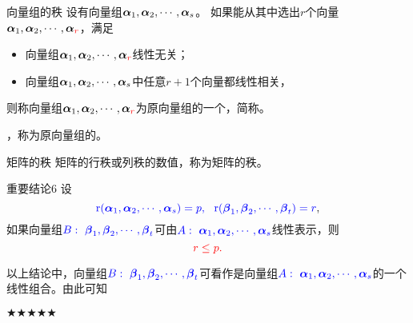 \begin{frame}
  \begin{footnotesize}
    \begin{block}{向量组的秩}
      设有向量组$\boldsymbol{\alpha}_1,\boldsymbol{\alpha}_2,\cdots,\boldsymbol{\alpha}_s$。
      如果能从其中选出$r$个向量$\boldsymbol{\alpha}_1,\boldsymbol{\alpha}_2,\cdots,\boldsymbol{\alpha}_{\textcolor{red}{r}}$，满足
      \begin{itemize}
      \item 向量组$\boldsymbol{\alpha}_1,\boldsymbol{\alpha}_2,\cdots,\boldsymbol{\alpha}_{\textcolor{red}{r}}$线性无关；
      \item 向量组$\boldsymbol{\alpha}_1,\boldsymbol{\alpha}_2,\cdots,\boldsymbol{\alpha}_s$中任意$r+1$个向量都线性相关，
      \end{itemize}
      则称向量组$\boldsymbol{\alpha}_1,\boldsymbol{\alpha}_2,\cdots,\boldsymbol{\alpha}_{\textcolor{red}{r}}$为原向量组的一个，简称。
      \vspace{0.1in}

      ，称为原向量组的。     
    \end{block}

    \begin{block}{矩阵的秩}
      矩阵的行秩或列秩的数值，称为矩阵的秩。
    \end{block}

  \end{footnotesize}
\end{frame}


\begin{frame}
  \begin{footnotesize}
    \begin{block}{重要结论6}
      设
      $$\textcolor{blue}{\mathrm{r}(\boldsymbol{\alpha}_1,\boldsymbol{\alpha}_2,\cdots,\boldsymbol{\alpha}_s)=p,~~\mathrm{r}(\boldsymbol{\beta}_1,\boldsymbol{\beta}_2,\cdots,\boldsymbol{\beta}_t)=r},$$
      如果向量组$\textcolor{blue}{B:~\boldsymbol{\beta}_1,\boldsymbol{\beta}_2,\cdots,\boldsymbol{\beta}_t}$可由$\textcolor{blue}{A:~\boldsymbol{\alpha}_1,\boldsymbol{\alpha}_2,\cdots,\boldsymbol{\alpha}_s}$线性表示，则
      $$\textcolor{red}{r\le p.}$$
    \end{block}

    以上结论中，向量组$\textcolor{blue}{B:~\boldsymbol{\beta}_1,\boldsymbol{\beta}_2,\cdots,\boldsymbol{\beta}_t}$可看作是向量组$\textcolor{blue}{A:~\boldsymbol{\alpha}_1,\boldsymbol{\alpha}_2,\cdots,\boldsymbol{\alpha}_s}$的一个线性组合。由此可知
    \begin{block}{$\bigstar\bigstar\bigstar\bigstar\bigstar$}      
    \end{block}
  \end{footnotesize}
\end{frame}



